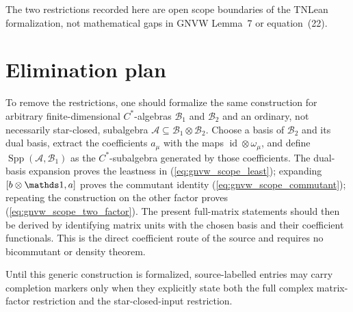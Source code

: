 \documentclass[11pt]{article}
\begin{document}
The two restrictions recorded here are open scope boundaries of the TNLean
formalization, not mathematical gaps in GNVW Lemma~7 or equation~(22).

\section{Elimination plan}

To remove the restrictions, one should formalize the same construction for
arbitrary finite-dimensional $C^*$-algebras $\mathcal B_1$ and $\mathcal B_2$
and an ordinary, not necessarily star-closed, subalgebra
$\mathcal A\subseteq\mathcal B_1\otimes\mathcal B_2$.
Choose a basis of $\mathcal B_2$ and its dual basis, extract the coefficients
$a_\mu$ with the maps $\operatorname{id}\otimes\omega_\mu$, and define
$\operatorname{Spp}(\mathcal A,\mathcal B_1)$ as the $C^*$-subalgebra generated
by those coefficients. The dual-basis expansion proves the leastness in
(\ref{eq:gnvw_scope_least}); expanding
$[b\otimes\Id,a]$ proves the commutant identity
(\ref{eq:gnvw_scope_commutant}); repeating the construction on the other
factor proves (\ref{eq:gnvw_scope_two_factor}). The present full-matrix
statements should then be derived by identifying matrix units with the chosen
basis and their coefficient functionals. This is the direct coefficient route
of the source and requires no bicommutant or density theorem.

Until this generic construction is formalized, source-labelled entries may
carry completion markers only when they explicitly state both the full complex
matrix-factor restriction and the star-closed-input restriction.



\end{document}

